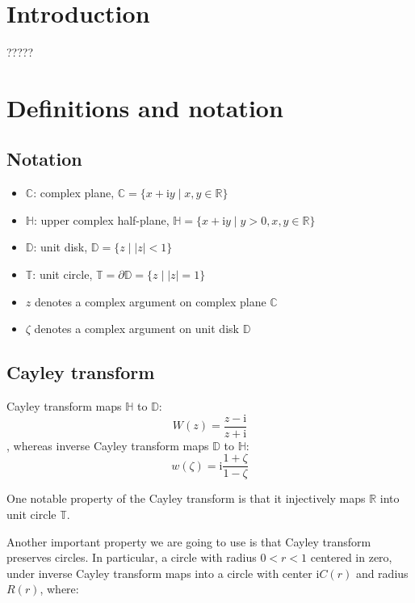 \documentclass{gCOV2e}
\theoremstyle{plain}%
\theoremstyle{definition}
\theoremstyle{remark}
\begin{document}
\section{Introduction}

????? 

\section{Definitions and notation}

\subsection{Notation}

\begin{itemize}
\item $\mathbb{C}$: complex plane, $\mathbb{C} = \{ x + \mathrm{i} y \mid x, y \in \mathbb{R} \}$ 
\item $\mathbb{H}$: upper complex half-plane, $\mathbb{H} = \{ x + \mathrm{i} y \mid y > 0, x, y \in \mathbb{R} \}$
\item $\mathbb{D}$: unit disk, $\mathbb{D} = \{ z \mid \left|z\right| < 1 \}$
\item $\mathbb{T}$: unit circle, $\mathbb{T} = \partial \mathbb{D} =  \{z \mid \left|z\right| = 1 \}$
\item $z$ denotes a complex argument on complex plane $\mathbb{C}$
\item $\zeta$ denotes a complex argument on unit disk $\mathbb{D}$
\end{itemize}

\subsection{Cayley transform}

Cayley transform maps $\mathbb{H}$ to $\mathbb{D}$:
\[
W(z) = \frac{z - \mathrm{i}}{z + \mathrm{i}}
\]
, whereas inverse Cayley transform maps $\mathbb{D}$ to $\mathbb{H}$:
\begin{equation}\label{eq:cayley_inverse}
w(\zeta) = \mathrm{i} \frac{1 + \zeta}{1 - \zeta}
\end{equation}

One notable property of the Cayley transform is that it injectively maps $\mathbb{R}$ into unit circle $\mathbb{T}$.

Another important property we are going to use is that Cayley transform preserves circles. In particular, a circle with radius $0 < r < 1$ centered in zero, under inverse Cayley transform maps into a circle with center $\mathrm{i} C(r)$ and radius $R(r)$, where:
\end{document}
